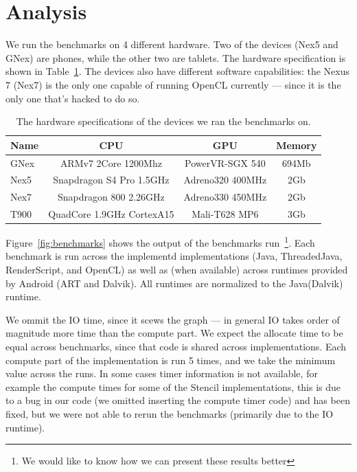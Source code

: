 \section*{Analysis}
\label{sec:analysis}

We run the benchmarks on 4 different hardware.
Two of the devices (Nex5 and GNex) are phones, while the other two are tablets.
The hardware specification is shown in Table~\ref{table:hardware}.
The devices also have different software capabilities: the Nexus 7 (Nex7)
  is the only one capable of running OpenCL currently --- since it is the only
  one that's hacked to do so.

\begin{table}[h]\small
\centering
\begin{tabular}{ | l | c | c | c |}
    \hline 
    Name & CPU & GPU & Memory \\ \hline
    GNex & ARMv7 2Core 1200Mhz & PowerVR-SGX 540 & 694Mb \\ \hline
    Nex5 & Snapdragon S4 Pro 1.5GHz & Adreno320 400MHz & 2Gb} \\ \hline
    Nex7 & Snapdragon 800 2.26GHz & Adreno330 450MHz & 2Gb} \\ \hline
    T900 & QuadCore 1.9GHz CortexA15 & Mali-T628 MP6 & 3Gb} \\ \hline
    \hline
\end{tabular}
\caption{The hardware specifications of the devices we ran the benchmarks on.}
\label{table:hardware}
\end{table}

Figure~\ref{fig:benchmarks} shows the output of the benchmarks run~\footnote{We would like to know how we can present these results better}.
Each benchmark is run across the implementd implementations (Java, ThreadedJava, RenderScript, and OpenCL) as well as (when available) across runtimes provided by Android (ART and Dalvik).
All runtimes are normalized to the Java(Dalvik) runtime.

We ommit the IO time, since it scews the graph --- in general IO takes 
  order of magnitude more time than the compute part.
We expect the allocate time to be equal across benchmarks, since
  that code is shared across implementations.
Each compute part of the implementation is run 5 times, and we 
  take the minimum value across the runs.
In some cases timer information is not available, for example the compute times for some of the Stencil implementations, this is due to a bug in our code (we omitted inserting the compute timer code) and has been fixed, but we were not able to rerun the benchmarks (primarily due to the IO runtime).


